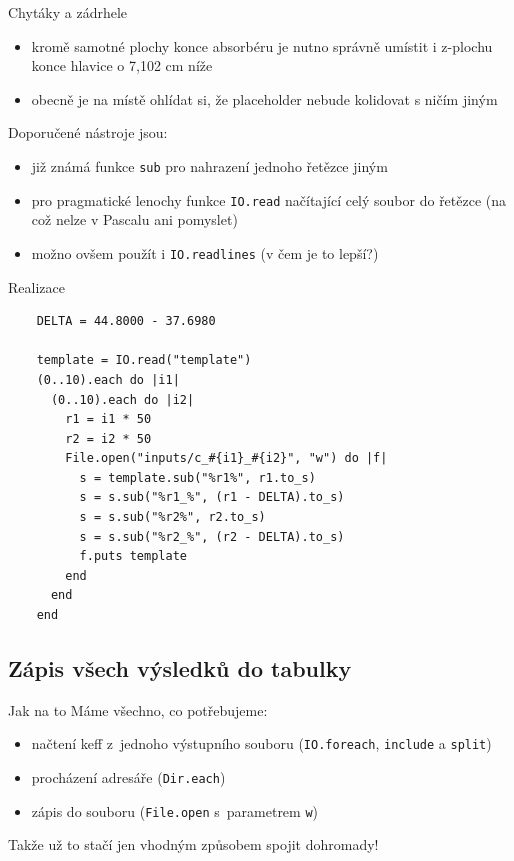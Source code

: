 \documentclass{beamer}
\begin{document}
\begin{frame}{Chytáky a zádrhele}
  \begin{itemize}
    \item kromě samotné plochy konce absorbéru je nutno správně umístit i z-plochu konce hlavice o 7,102 cm níže
    \item obecně je na místě ohlídat si, že placeholder nebude kolidovat s ničím jiným
  \end{itemize}
  Doporučené nástroje jsou:
  \begin{itemize}
    \item již známá funkce \texttt{sub} pro nahrazení jednoho řetězce jiným
    \item pro pragmatické lenochy funkce \texttt{IO.read} načítající celý soubor do řetězce (na což nelze v Pascalu ani pomyslet)
    \item možno ovšem použít i \texttt{IO.readlines} (v čem je to lepší?)
  \end{itemize}
\end{frame}

\begin{frame}[fragile]{Realizace}
  \scriptsize
  \begin{verbatim}
    DELTA = 44.8000 - 37.6980

    template = IO.read("template")
    (0..10).each do |i1|
      (0..10).each do |i2|
        r1 = i1 * 50
        r2 = i2 * 50
        File.open("inputs/c_#{i1}_#{i2}", "w") do |f|
          s = template.sub("%r1%", r1.to_s)
          s = s.sub("%r1_%", (r1 - DELTA).to_s)
          s = s.sub("%r2%", r2.to_s)
          s = s.sub("%r2_%", (r2 - DELTA).to_s)
          f.puts template
        end
      end
    end
  \end{verbatim}
\end{frame}

\subsection{Zápis všech výsledků do tabulky}

\begin{frame}{Jak na to}
  Máme všechno, co potřebujeme:
  \begin{itemize}
    \item načtení keff z~jednoho výstupního souboru (\texttt{IO.foreach}, \texttt{include} a \texttt{split})
    \item procházení adresáře (\texttt{Dir.each})
    \item zápis do souboru (\texttt{File.open} s~parametrem \texttt{w})
  \end{itemize}
  Takže už to stačí jen vhodným způsobem spojit dohromady!
\end{frame}
\end{document}
